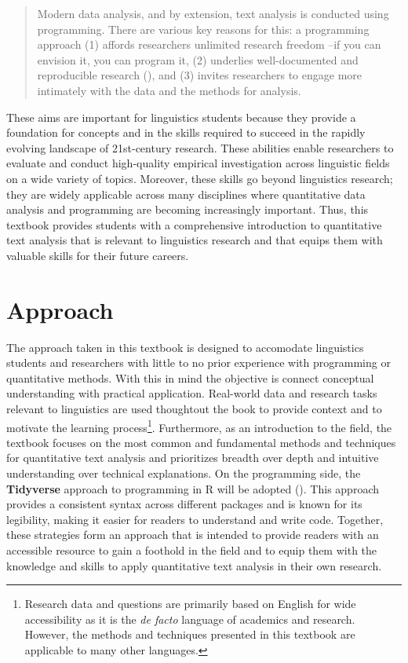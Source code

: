 \documentclass[
  letterpaper,
]{latex/krantz}
\theoremstyle{definition}
\theoremstyle{remark}
\begin{document}
\begin{quote}
Modern data analysis, and by extension, text analysis is conducted using
programming. There are various key reasons for this: a programming
approach (1) affords researchers unlimited research freedom --if you can
envision it, you can program it, (2) underlies well-documented and
reproducible research (), and
(3) invites researchers to engage more intimately with the data and the
methods for analysis.
\end{quote}

These aims are important for linguistics students because they provide a
foundation for concepts and in the skills required to succeed in the
rapidly evolving landscape of 21st-century research. These abilities
enable researchers to evaluate and conduct high-quality empirical
investigation across linguistic fields on a wide variety of topics.
Moreover, these skills go beyond linguistics research; they are widely
applicable across many disciplines where quantitative data analysis and
programming are becoming increasingly important. Thus, this textbook
provides students with a comprehensive introduction to quantitative text
analysis that is relevant to linguistics research and that equips them
with valuable skills for their future careers.

\section*{Approach}\label{sec-preface-approach}


The approach taken in this textbook is designed to accomodate
linguistics students and researchers with little to no prior experience
with programming or quantitative methods. With this in mind the
objective is connect conceptual understanding with practical
application. Real-world data and research tasks relevant to linguistics
are used thoughtout the book to provide context and to motivate the
learning process\footnote{Research data and questions are primarily
  based on English for wide accessibility as it is the \emph{de facto}
  language of academics and research. However, the methods and
  techniques presented in this textbook are applicable to many other
  languages.}. Furthermore, as an introduction to the field, the
textbook focuses on the most common and fundamental methods and
techniques for quantitative text analysis and prioritizes breadth over
depth and intuitive understanding over technical explanations. On the
programming side, the
\textbf{Tidyverse} approach to
programming in R will be adopted (). This approach provides a consistent syntax across different
packages and is known for its legibility, making it easier for readers
to understand and write code. Together, these strategies form an
approach that is intended to provide readers with an accessible resource
to gain a foothold in the field and to equip them with the knowledge and
skills to apply quantitative text analysis in their own research.
\end{document}
